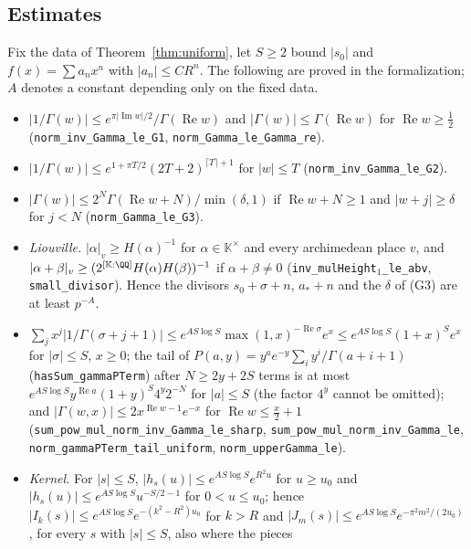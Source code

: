 \begin{small}
\subsection{Estimates}\label{app:estimates}
Fix the data of Theorem~\ref{thm:uniform}, let $S \ge 2$ bound $|s_0|$ and $f(x) = \sum a_nx^n$ with
$|a_n| \le CR^n$. The following are proved in the formalization; $A$ denotes a constant depending only on the fixed
data.
\begin{itemize}
\item[(G1)] $|1/\Gamma(w)| \le e^{\pi|\operatorname{Im}w|/2}/\Gamma(\operatorname{Re}w)$ and
$|\Gamma(w)| \le \Gamma(\operatorname{Re}w)$ for $\operatorname{Re}w \ge \frac12$ (\nolinkurl{norm_inv_Gamma_le_G1},
\nolinkurl{norm_Gamma_le_Gamma_re}).
\item[(G2)] $|1/\Gamma(w)| \le e^{1+\pi T/2}(2T+2)^{\lceil T\rceil+1}$ for $|w| \le T$ (\nolinkurl{norm_inv_Gamma_le_G2}).
\item[(G3)] $|\Gamma(w)| \le 2^N\Gamma(\operatorname{Re}w + N)/\min(\delta, 1)$ if $\operatorname{Re}w + N \ge 1$ and
$|w + j| \ge \delta$ for $j < N$ (\nolinkurl{norm_Gamma_le_G3}).
\item[(Li)] \emph{Liouville.} $|\alpha|_v \ge H(\alpha)^{-1}$ for $\alpha \in \mathbb K^\times$ and every archimedean
place $v$, and $|\alpha + \beta|_v \ge (2^{[\mathbb K:\QQ]}H(\alpha)H(\beta))^{-1}$ if $\alpha + \beta \ne 0$
(\nolinkurl{inv_mulHeight}$_1$\nolinkurl{_le_abv}, \nolinkurl{small_divisor}). Hence the divisors $s_0 + \sigma + n$, $a_* + n$ and
the $\delta$ of (G3) are at least $p^{-A}$.
\item[(GS)] $\sum_jx^j|1/\Gamma(\sigma + j + 1)| \le e^{AS\log S}\max(1,x)^{-\operatorname{Re}\sigma}e^x
\le e^{AS\log S}(1+x)^Se^x$ for $|\sigma| \le S$, $x \ge 0$; the tail of
$P(a,y) = y^ae^{-y}\sum_iy^i/\Gamma(a+i+1)$ (\nolinkurl{hasSum_gammaPTerm}) after $N \ge 2y + 2S$ terms is at most
$e^{AS\log S}y^{\operatorname{Re}a}(1+y)^S4^y2^{-N}$ for $|a| \le S$ (the factor $4^y$ cannot be omitted); and
$|\Gamma(w,x)| \le 2x^{\operatorname{Re}w-1}e^{-x}$ for $\operatorname{Re}w \le \frac x2 + 1$
(\nolinkurl{sum_pow_mul_norm_inv_Gamma_le_sharp}, \nolinkurl{sum_pow_mul_norm_inv_Gamma_le},
\nolinkurl{norm_gammaPTerm_tail_uniform}, \nolinkurl{norm_upperGamma_le}).
\item[(KB)] \emph{Kernel.} For $|s| \le S$, $|h_s(u)| \le e^{AS\log S}e^{R^2u}$ for $u \ge u_0$ and
$|h_s(u)| \le e^{AS\log S}u^{-S/2-1}$ for $0 < u \le u_0$; hence $|I_k(s)| \le e^{AS\log S}e^{-(k^2-R^2)u_0}$ for
$k > R$ and $|J_m(s)| \le e^{AS\log S}e^{-\pi^2m^2/(2u_0)}$, for every $s$ with $|s| \le S$, also where the pieces

\end{itemize}
\end{small}
